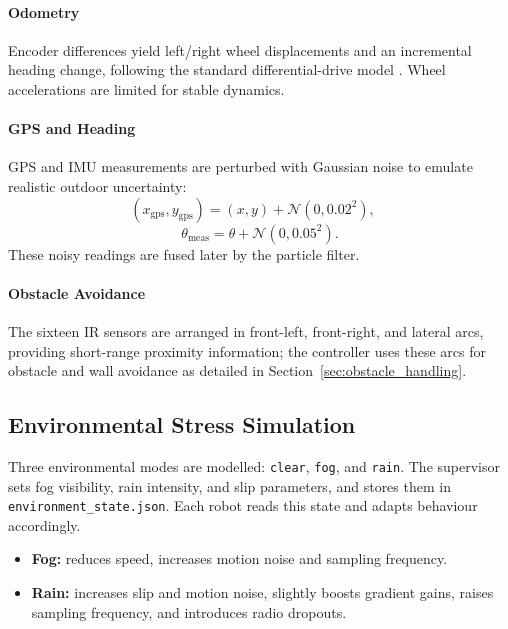 \documentclass[lettersize,journal]{IEEEtran}
\begin{document}
\paragraph*{Odometry}
Encoder differences yield left/right wheel displacements and an incremental
heading change, following the standard differential-drive model
\cite{ref15}. Wheel accelerations are limited for stable
dynamics.

\paragraph*{GPS and Heading}
GPS and IMU measurements are perturbed with Gaussian noise to emulate realistic
outdoor uncertainty:
\begin{equation}
(x_{\text{gps}}, y_{\text{gps}}) = (x,y) + \mathcal{N}(0,0.02^2),\quad
\end{equation}
\begin{equation}
\theta_{\text{meas}} = \theta + \mathcal{N}(0,0.05^2).
\end{equation}
These noisy readings are fused later by the particle filter.

\paragraph*{Obstacle Avoidance}
The sixteen IR sensors are arranged in front-left, front-right, and lateral
arcs, providing short-range proximity information; the controller uses these
arcs for obstacle and wall avoidance as detailed in Section~\ref{sec:obstacle_handling}.

\subsection{Environmental Stress Simulation }

Three environmental modes are modelled: \texttt{clear}, \texttt{fog}, and
\texttt{rain}. The supervisor sets fog visibility, rain intensity, and slip
parameters, and stores them in \texttt{environment\_state.json}. Each robot
reads this state and adapts behaviour accordingly.

\begin{itemize}
    \item \textbf{Fog:} reduces speed, increases motion noise and sampling frequency.
    \item \textbf{Rain:} increases slip and motion noise, slightly boosts gradient gains,
    raises sampling frequency, and introduces radio dropouts.
\end{itemize}
\end{document}
